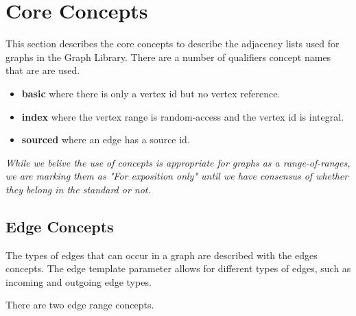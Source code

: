 


\section{Core Concepts}

This section describes the core concepts to describe the adjacency lists used for graphs in the Graph Library. There are a 
number of qualifiers concept names that are are used.
\begin{itemize}
    \item \textbf{basic} where there is only a vertex id but no vertex reference.
    \item \textbf{index} where the vertex range is random-access and the vertex id is integral.
    \item \textbf{sourced} where an edge has a source id.
\end{itemize}

\emph{While we belive the use of concepts is appropriate for graphs as a range-of-ranges, we are marking them as "For exposition only" 
until we have consensus of whether they belong in the standard or not.}

\subsection{Edge Concepts}
The types of edges that can occur in a graph are described with the edges concepts. The  edge template parameter allows
for different types of edges, such as incoming and outgoing edge types.
{\small
     
}

There are two edge range concepts.



